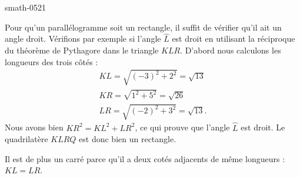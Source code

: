 \begin{corrige}{smath-0521}
\begin{enumerate}
            Pour qu'un parallélogramme soit un rectangle, il suffit de vérifier qu'il ait un angle droit. Vérifions par exemple si l'angle \( \hat L\) est droit en utilisant la réciproque du théorème de Pythagore dans le triangle \( KLR\). D'abord nous calculons les longueurs des trois côtés :
            \begin{subequations}
                \begin{align}
                    KL=\sqrt{(-3)^2+2^2}=\sqrt{13}\\
                    KR=\sqrt{1^2+5^2}=\sqrt{26}\\
                    LR=\sqrt{(-2)^2+3^2}=\sqrt{13}.
                \end{align}
            \end{subequations}
            Nous avons bien \( KR^2=KL^2+LR^2\), ce qui prouve que l'angle \( \hat L\) est droit. Le quadrilatère \( KLRQ\) est donc bien un rectangle.

            Il est de plus un carré parce qu'il a deux cotés adjacents de même longueurs : \( KL=LR\).

    \end{enumerate}
    
\end{corrige}
